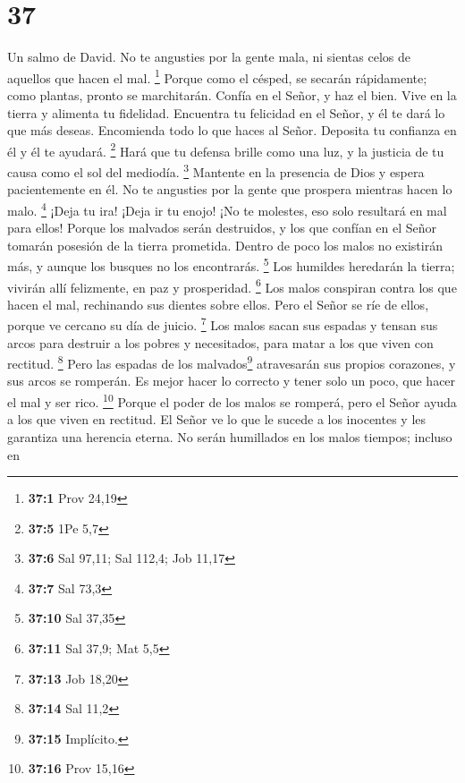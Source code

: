 \hypertarget{section-36}{%
\section{37}\label{section-36}}

Un salmo de David.  No te angusties por la gente mala, ni
sientas celos de aquellos que hacen el mal. \footnote{\textbf{37:1} Prov
  24,19}  Porque como el césped, se secarán rápidamente;
como plantas, pronto se marchitarán.  Confía en el Señor,
y haz el bien. Vive en la tierra y alimenta tu fidelidad. 
Encuentra tu felicidad en el Señor, y él te dará lo que más deseas.
 Encomienda todo lo que haces al Señor. Deposita tu
confianza en él y él te ayudará. \footnote{\textbf{37:5} 1Pe 5,7}
 Hará que tu defensa brille como una luz, y la justicia de
tu causa como el sol del mediodía. \footnote{\textbf{37:6} Sal 97,11;
  Sal 112,4; Job 11,17}  Mantente en la presencia de Dios
y espera pacientemente en él. No te angusties por la gente que prospera
mientras hacen lo malo. \footnote{\textbf{37:7} Sal 73,3} 
¡Deja tu ira! ¡Deja ir tu enojo! ¡No te molestes, eso solo resultará en
mal para ellos!  Porque los malvados serán destruidos, y
los que confían en el Señor tomarán posesión de la tierra prometida.
 Dentro de poco los malos no existirán más, y aunque los
busques no los encontrarás. \footnote{\textbf{37:10} Sal 37,35}
 Los humildes heredarán la tierra; vivirán allí
felizmente, en paz y prosperidad. \footnote{\textbf{37:11} Sal 37,9; Mat
  5,5}  Los malos conspiran contra los que hacen el mal,
rechinando sus dientes sobre ellos.  Pero el Señor se ríe
de ellos, porque ve cercano su día de juicio. \footnote{\textbf{37:13}
  Job 18,20}  Los malos sacan sus espadas y tensan sus
arcos para destruir a los pobres y necesitados, para matar a los que
viven con rectitud. \footnote{\textbf{37:14} Sal 11,2} 
Pero las espadas de los malvados\footnote{\textbf{37:15} Implícito.}
atravesarán sus propios corazones, y sus arcos se romperán.
 Es mejor hacer lo correcto y tener solo un poco, que
hacer el mal y ser rico. \footnote{\textbf{37:16} Prov 15,16}
 Porque el poder de los malos se romperá, pero el Señor
ayuda a los que viven en rectitud.  El Señor ve lo que le
sucede a los inocentes y les garantiza una herencia eterna.
 No serán humillados en los malos tiempos; incluso en
